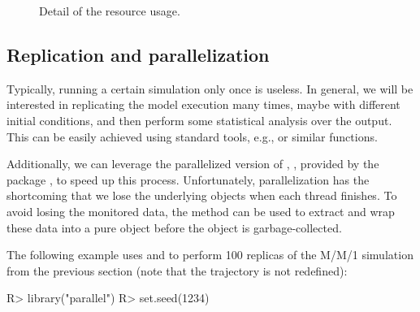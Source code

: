 \documentclass[
  nojss]{jss}
\begin{document}
\begin{CodeChunk}
\begin{figure}

{\centering {}

}

\caption[Detail of the resource usage\label{mm1-plot}]{Detail of the resource usage\label{mm1-plot}.}\label{fig:mm1-plot}
\end{figure}
\end{CodeChunk}

\subsection{Replication and
parallelization}\label{replication-and-parallelization}

Typically, running a certain simulation only once is useless. In
general, we will be interested in replicating the model execution many
times, maybe with different initial conditions, and then perform some
statistical analysis over the output. This can be easily achieved using
standard  tools, e.g.,  or similar functions.

Additionally, we can leverage the parallelized version of
, , provided by the 
package \citep{CRAN:r}, to speed up this process. Unfortunately,
parallelization has the shortcoming that we lose the underlying
 objects when each thread finishes. To avoid losing the
monitored data, the  method can be used to extract and wrap
these data into a pure  object before the 
object is garbage-collected.

The following example uses  and  to
perform 100 replicas of the M/M/1 simulation from the previous section
(note that the trajectory is not redefined):

\begin{CodeChunk}
\begin{CodeInput}
R> library("parallel")
R> set.seed(1234)
\end{CodeInput}
\end{CodeChunk}
\end{document}
